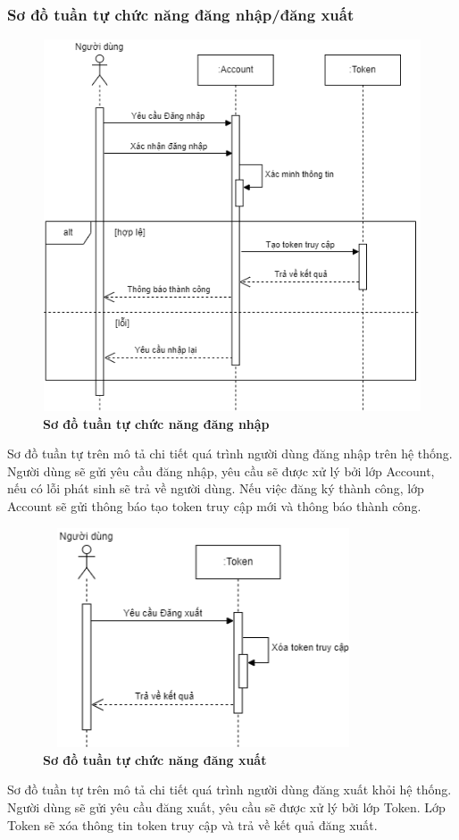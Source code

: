 \subsubsection{Sơ đồ tuần tự chức năng đăng nhập/đăng xuất}
\begin{figure}[H]
  \centering
  \includegraphics[width=12cm,height=11cm]{Images/sequence/sequence_login.png}
  \caption[Sơ đồ tuần tự chức năng đăng nhập]{\bfseries \fontsize{12pt}{0pt}
  \selectfont Sơ đồ tuần tự chức năng đăng nhập}
  \label{sequence_login} %
\end{figure}
Sơ đồ tuần tự trên mô tả chi tiết quá trình người dùng đăng nhập trên hệ thống. Người dùng sẽ gửi yêu cầu đăng nhập, yêu cầu sẽ được xử lý
bởi lớp Account, nếu có lỗi phát sinh sẽ trả về người dùng. Nếu việc đăng ký thành công, lớp Account sẽ gửi thông báo 
tạo token truy cập mới và thông báo thành công. 
\begin{figure}[H]
  \centering
  \includegraphics[width=9.5cm,height=6.5cm]{Images/sequence/sequence_logout.png}
  \caption[Sơ đồ tuần tự chức năng đăng xuất]{\bfseries \fontsize{12pt}{0pt}
  \selectfont Sơ đồ tuần tự chức năng đăng xuất}
  \label{sequence_logout} %
\end{figure}
Sơ đồ tuần tự trên mô tả chi tiết quá trình người dùng đăng xuất khỏi hệ thống. Người dùng sẽ gửi yêu cầu đăng xuất, yêu cầu sẽ được xử lý
bởi lớp Token. Lớp Token sẽ xóa thông tin token truy cập và trả về kết quả đăng xuất.

